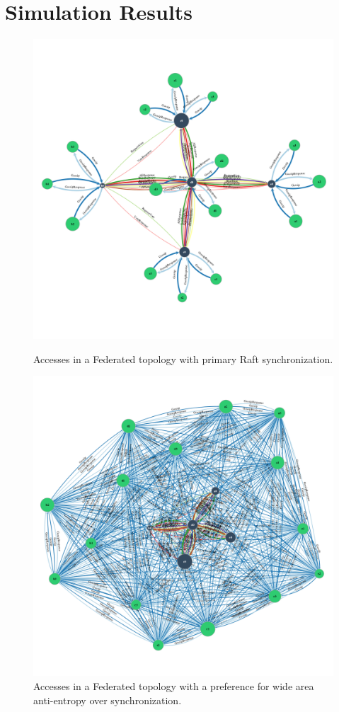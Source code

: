 \documentclass[10pt,conference,compsocconf,letterpaper]{IEEEtran}
\begin{document}
\section{Simulation Results}

\begin{figure}
    \centering
      \includegraphics[width=\linewidth]{figures/conflict/federated_sync}
      \caption{Accesses in a Federated topology with primary Raft synchronization.}\label{fig:federated_sync}
    \endminipage\hfill
      \includegraphics[width=\linewidth]{figures/conflict/federated_eventual}
      \caption{Accesses in a Federated topology with a preference for wide area anti-entropy over synchronization.}\label{fig:federated_eventual}
    \endminipage\hfill
\end{figure}
\end{document}
